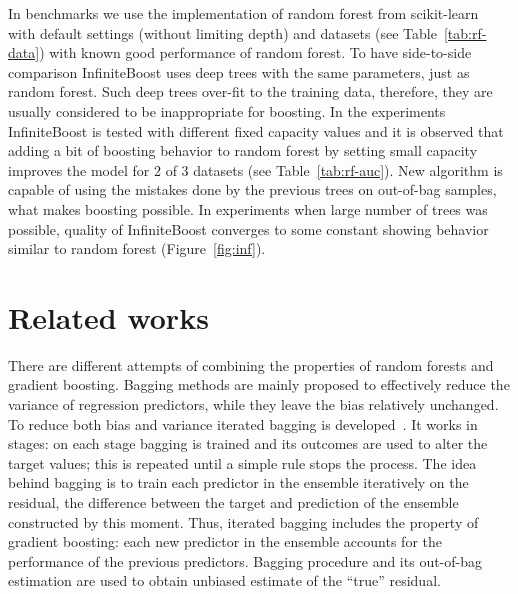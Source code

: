 In benchmarks we use the implementation of random forest from scikit-learn~\cite{key-sklearn}
with default settings (without limiting depth) and datasets (see Table~\ref{tab:rf-data}) with known good performance of random forest.
To have side-to-side comparison InfiniteBoost uses deep trees with the same parameters, just as random forest.
Such deep trees over-fit to the training data, therefore, they are usually considered to be inappropriate for boosting.
In the experiments InfiniteBoost is tested with different fixed capacity values and it is observed that
adding a bit of boosting behavior to random forest by setting small capacity improves the model for 2 of 3 datasets (see Table~\ref{tab:rf-auc}).
New algorithm is capable of using the mistakes done by the previous trees on out-of-bag samples, what makes boosting possible.
In experiments when large number of trees was possible, quality of InfiniteBoost converges to some constant
showing behavior similar to random forest (Figure~\ref{fig:inf}).

\insertplotsforestnips

\clearpagebiblio 
\section{Related works}
There are different attempts of combining the properties of random forests and gradient boosting.
Bagging methods are mainly proposed to effectively reduce the variance of regression predictors, while they leave the bias relatively unchanged. 
To reduce both bias and variance iterated bagging is developed~\cite{key-iterated-bagging}. 
It works in stages: on each stage bagging is trained and its outcomes are used to alter the target values; this is repeated until a simple rule stops the process. 
The idea behind bagging is to train each predictor in the ensemble iteratively on the residual, the difference between the target and prediction of the ensemble constructed by this moment.
Thus, iterated bagging includes the property of gradient boosting: each new predictor in the ensemble accounts for the performance of the previous predictors.
Bagging procedure and its out-of-bag estimation are used to obtain unbiased estimate of the “true” residual. 

